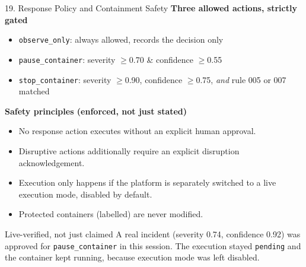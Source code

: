 \documentclass[aspectratio=169, 11pt]{beamer}
\begin{document}
\begin{frame}{19. Response Policy and Containment Safety}
    \footnotesize
    \textbf{Three allowed actions, strictly gated}
    \begin{itemize}\setlength\itemsep{2pt}
        \item \texttt{observe\_only}: always allowed, records the decision only
        \item \texttt{pause\_container}: severity $\geq$0.70 \& confidence $\geq$0.55
        \item \texttt{stop\_container}: severity $\geq$0.90, confidence $\geq$0.75, \emph{and} rule 005 or 007 matched
    \end{itemize}
    \vspace{0.1cm}
    \textbf{Safety principles (enforced, not just stated)}
    \begin{itemize}\setlength\itemsep{2pt}
        \item No response action executes without an explicit human approval.
        \item Disruptive actions additionally require an explicit disruption acknowledgement.
        \item Execution only happens if the platform is separately switched to a live execution mode, disabled by default.
        \item Protected containers (labelled) are never modified.
    \end{itemize}
    \begin{block}{\scriptsize Live-verified, not just claimed}
        \scriptsize A real incident (severity 0.74, confidence 0.92) was approved for \texttt{pause\_container} in this session. The execution stayed \texttt{pending} and the container kept running, because execution mode was left disabled.
    \end{block}
    \vspace{0.05cm}
    \fboxsep=4pt
\end{frame}
\end{document}

